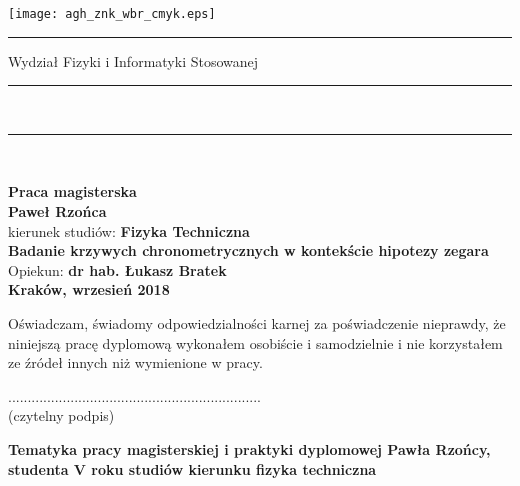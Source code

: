\pagestyle{empty}
\texttt{[image: agh\_znk\_wbr\_cmyk.eps]}\\
\rule{30mm}{0pt}
{\large\textsf{Wydział Fizyki i Informatyki Stosowanej}}\\
\rule{\textwidth}{3pt}\\
\rule[2ex]
{\textwidth}{1pt}\\
\vspace{7ex}
\begin{center}
{\bf\LARGE\textsf{Praca magisterska}}\\
\vspace{13ex}
{\bf\Large\textsf{Paweł Rzońca}}\\
\vspace{3ex}
{\sf \small kierunek studiów:} {\bf\small\textsf{Fizyka Techniczna}}\\
\vspace{15ex}
{\bf\huge\textsf{Badanie krzywych chronometrycznych w kontekście hipotezy zegara}}\\
\vspace{14ex}
{\sf \Large Opiekun:} {\bf\Large\textsf{dr hab. Łukasz Bratek}}\\
\vspace{22ex}
\textsf{\bf\large\textsf{Kraków, wrzesień 2018}}
\end{center}
\newpage
{\sf Oświadczam, świadomy odpowiedzialności karnej za poświadczenie nieprawdy,
że niniejszą pracę dyplomową wykonałem osobiście i samodzielnie i nie korzystałem
ze źródeł innych niż wymienione w pracy.}

\vspace{14ex}

\begin{flushright}
................................................................. \\
{\sf (czytelny podpis)}
\end{flushright}
\newpage

\newpage
{}
\begin{center}
{\bf Tematyka pracy magisterskiej i praktyki dyplomowej
Pawła Rzońcy,
studenta V roku studiów kierunku fizyka techniczna}\\
\end{center}

